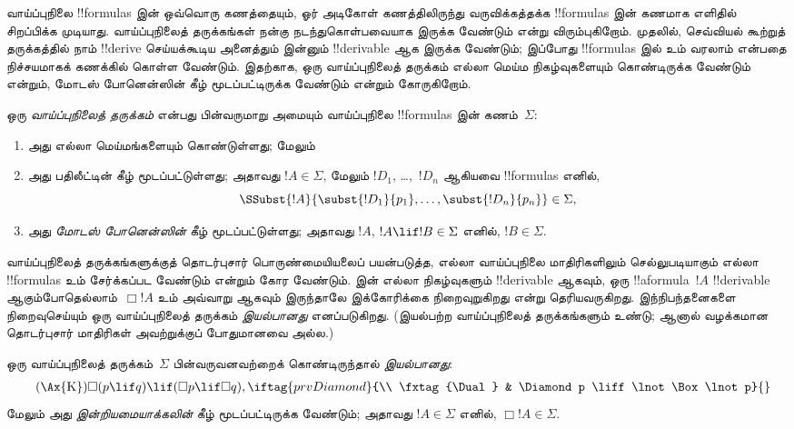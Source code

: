 \documentclass[../../../include/open-logic-section]{subfiles}
\begin{document}


வாய்ப்புநிலை !!{formula}s இன் ஒவ்வொரு கணத்தையும், ஓர் அடிகோள் கணத்திலிருந்து
வருவிக்கத்தக்க !!{formula}s இன் கணமாக எளிதில் சிறப்பிக்க முடியாது.
வாய்ப்புநிலைத் தருக்கங்கள் நன்கு நடந்துகொள்பவையாக இருக்க வேண்டும் என்று
விரும்புகிறோம். முதலில், செவ்வியல் கூற்றுத் தருக்கத்தில் நாம் !!{derive}
செய்யக்கூடிய அனைத்தும் இன்னும் !!{derivable} ஆக இருக்க வேண்டும்; இப்போது
!!{formula}s இல்
 உம் வரலாம் என்பதை
நிச்சயமாகக் கணக்கில் கொள்ள வேண்டும். இதற்காக, ஒரு வாய்ப்புநிலைத் தருக்கம்
எல்லா மெய்ம நிகழ்வுகளையும் கொண்டிருக்க வேண்டும் என்றும், மோடஸ்
போனென்ஸின் கீழ் மூடப்பட்டிருக்க வேண்டும் என்றும் கோருகிறோம்.

\begin{defn}
  ஒரு \emph{வாய்ப்புநிலைத் தருக்கம்} என்பது பின்வருமாறு அமையும்
  வாய்ப்புநிலை !!{formula}s இன் கணம்~$\Sigma$:
  \begin{enumerate}
  \item அது எல்லா மெய்மங்களையும் கொண்டுள்ளது; மேலும்
  \item அது பதிலீட்டின் கீழ் மூடப்பட்டுள்ளது; அதாவது $!A \in \Sigma$,
    மேலும் $!D_1$, \dots,~$!D_n$ ஆகியவை !!{formula}s எனில்,
    \[
    \SSubst{!A}{\subst{!D_1}{p_1}, \dots, \subst{!D_n}{p_n}} \in \Sigma,
    \]
  \item அது \emph{மோடஸ் போனென்ஸின்} கீழ் மூடப்பட்டுள்ளது; அதாவது $!A$,
    $!A \lif !B \in \Sigma$ எனில், $!B \in \Sigma$.
  \end{enumerate}
\end{defn}

வாய்ப்புநிலைத் தருக்கங்களுக்குத் தொடர்புசார் பொருண்மையியலைப் பயன்படுத்த,
எல்லா வாய்ப்புநிலை மாதிரிகளிலும் செல்லுபடியாகும் எல்லா !!{formula}s உம்
சேர்க்கப்பட வேண்டும் என்றும் கோர வேண்டும்.  இன் எல்லா நிகழ்வுகளும் !!{derivable} ஆகவும், ஒரு
!!a{formula}~$!A$ !!{derivable} ஆகும்போதெல்லாம்~$\Box !A$ உம் அவ்வாறு
ஆகவும் இருந்தாலே இக்கோரிக்கை நிறைவுறுகிறது என்று தெரியவருகிறது. இந்நிபந்தனைகளை
நிறைவுசெய்யும் ஒரு வாய்ப்புநிலைத் தருக்கம் \emph{இயல்பானது} எனப்படுகிறது.
(இயல்பற்ற வாய்ப்புநிலைத் தருக்கங்களும் உண்டு; ஆனால் வழக்கமான தொடர்புசார்
மாதிரிகள் அவற்றுக்குப் போதுமானவை அல்ல.)

\begin{defn}
  ஒரு வாய்ப்புநிலைத் தருக்கம்~$\Sigma$ பின்வருவனவற்றைக் கொண்டிருந்தால்
  \emph{இயல்பானது}:
  \begin{align*}
    \tag{\Ax{K}} & \Box(p \lif q) \lif (\Box p \lif \Box q),
    \iftag{prvDiamond}{\\
      \tag{\Dual} & \Diamond p \liff \lnot\Box\lnot p}{}
  \end{align*}
  மேலும் அது \emph{இன்றியமையாக்கலின்} கீழ் மூடப்பட்டிருக்க வேண்டும்;
  அதாவது $!A \in \Sigma$ எனில், $\Box !A \in \Sigma$.
\end{defn}
\end{document}
